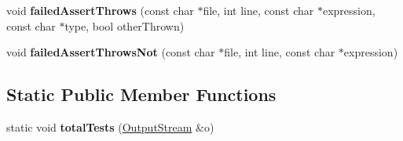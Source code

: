 \begin{DoxyCompactItemize}
\item 
\hypertarget{classCxxTest_1_1XmlFormatter_a8c65cab8b4235eacd963977f726dbdb4}{void {\bfseries failed\-Assert\-Throws} (const char $\ast$file, int line, const char $\ast$expression, const char $\ast$type, bool other\-Thrown)}\label{classCxxTest_1_1XmlFormatter_a8c65cab8b4235eacd963977f726dbdb4}

\item 
\hypertarget{classCxxTest_1_1XmlFormatter_ac48cf285f1832e97aa2382130dbdd2c0}{void {\bfseries failed\-Assert\-Throws\-Not} (const char $\ast$file, int line, const char $\ast$expression)}\label{classCxxTest_1_1XmlFormatter_ac48cf285f1832e97aa2382130dbdd2c0}

\end{DoxyCompactItemize}
\subsection*{Static Public Member Functions}
\begin{DoxyCompactItemize}
\item 
\hypertarget{classCxxTest_1_1XmlFormatter_a86cbe96ca72c15e02842a400fe668999}{static void {\bfseries total\-Tests} (\hyperlink{classCxxTest_1_1OutputStream}{Output\-Stream} \&o)}\label{classCxxTest_1_1XmlFormatter_a86cbe96ca72c15e02842a400fe668999}

\end{DoxyCompactItemize}

